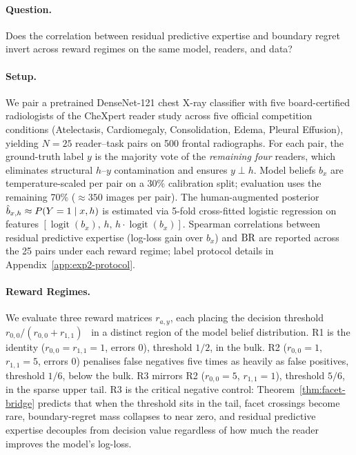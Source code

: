 \paragraph{Question.}
Does the correlation between residual predictive expertise and boundary regret invert across reward regimes on the same model, readers, and data?

\paragraph{Setup.}
We pair a pretrained DenseNet-121 chest X-ray classifier \citep{Huang2017,Cohen2022} with five board-certified radiologists of the CheXpert reader study \citep{Irvin2019} across five official competition conditions (Atelectasis, Cardiomegaly, Consolidation, Edema, Pleural Effusion), yielding $N=25$ reader--task pairs on 500 frontal radiographs.
For each pair, the ground-truth label $y$ is the majority vote of the \emph{remaining four} readers, which eliminates structural $h$--$y$ contamination and ensures $y \perp h$.
Model beliefs $b_x$ are temperature-scaled per pair on a 30\% calibration split; evaluation uses the remaining 70\% (${\approx}350$ images per pair).
The human-augmented posterior $\hat{b}_{x,h} \approx P(Y=1 \mid x, h)$ is estimated via 5-fold cross-fitted logistic regression on features $[\operatorname{logit}(b_x),\, h,\, h \cdot \operatorname{logit}(b_x)]$.
Spearman correlations between residual predictive expertise (log-loss gain over $b_x$) and $\operatorname{BR}$ are reported across the 25 pairs under each reward regime; label protocol details in Appendix~\ref{app:exp2-protocol}.

\paragraph{Reward Regimes.}
We evaluate three reward matrices $r_{a,y}$, each placing the decision threshold $r_{0,0}/(r_{0,0}+r_{1,1})$~\citep{PaukerKassirer1980} in a distinct region of the model belief distribution.
R1 is the identity ($r_{0,0}=r_{1,1}=1$, errors $0$), threshold $1/2$, in the bulk.
R2 ($r_{0,0}=1$, $r_{1,1}=5$, errors $0$) penalises false negatives five times as heavily as false positives, threshold $1/6$, below the bulk.
R3 mirrors R2 ($r_{0,0}=5$, $r_{1,1}=1$), threshold $5/6$, in the sparse upper tail.
R3 is the critical negative control: Theorem~\ref{thm:facet-bridge} predicts that when the threshold sits in the tail, facet crossings become rare, boundary-regret mass collapses to near zero, and residual predictive expertise decouples from decision value regardless of how much the reader improves the model's log-loss.

